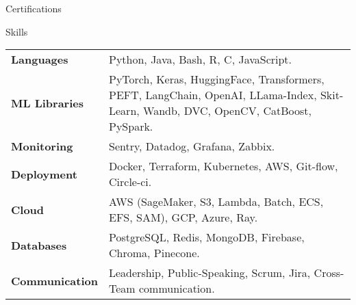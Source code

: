 \documentclass{resume}
\begin{document}
\begin{multicols}{2}
	
	\begin{rSection}{\Large Certifications}
		\begin{description}
			\setlength\itemsep{-0.5em}
			\item[$\bullet$] 
			\item[$\bullet$] 
			\item[$\bullet$] 
			\item[$\bullet$]  
			\item[$\bullet$] 	
		\end{description}
	\end{rSection}

	\begin{rSection}{\Large Skills}
		\noindent
		 \setlength{\tabcolsep}{2pt}
    \begin{tabularx}{0.50\textwidth}{@{\textbullet\hspace{\labelsep}}lX}
        \textbf{Languages} & Python, Java, Bash, R, C, JavaScript. \\
        \textbf{ML Libraries} & PyTorch, Keras, HuggingFace, Transformers, PEFT, LangChain, OpenAI, LLama-Index, Skit-Learn, Wandb, DVC, OpenCV, CatBoost, PySpark. \\
        \textbf{Monitoring} & Sentry, Datadog, Grafana, Zabbix. \\
        \textbf{Deployment} & Docker, Terraform, Kubernetes, AWS, Git-flow, Circle-ci. \\
        \textbf{Cloud} & AWS (SageMaker, S3, Lambda, Batch, ECS, EFS, SAM), GCP, Azure, Ray. \\
        \textbf{Databases} & PostgreSQL, Redis, MongoDB, Firebase, Chroma, Pinecone. \\
        \textbf{Communication} & Leadership, Public-Speaking, Scrum, Jira, Cross-Team communication. \\
    \end{tabularx}
	\end{rSection}


\end{multicols}
\end{document}
